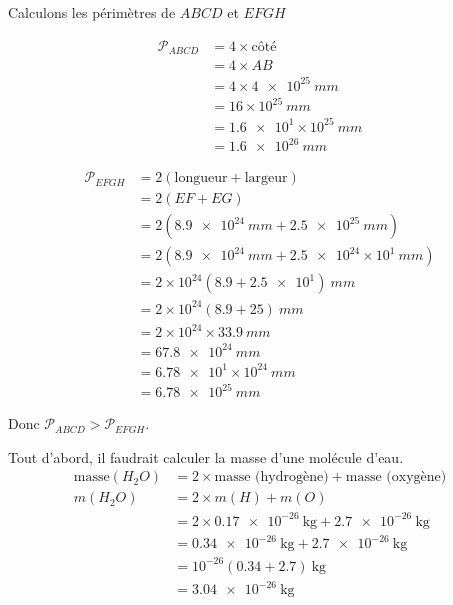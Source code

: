 \documentclass[../Cours.tex]{subfiles}
\begin{document}
\begin{questions}
        \question Calculons les périmètres de $ABCD$ et $EFGH$\\
        \noindent\begin{minipage}{0.5\linewidth}
        \begin{align*}
            \mathcal{P}_{ABCD} &= 4 \times \mbox{côté} \\
            &= 4 \times AB \\
            &= 4 \times \qty{4e25}{mm} \\
            &= 16 \times 10^{25}~\unit{mm} \\
            &= \num{1.6e1} \times 10^{25}~\unit{mm} \\
            &= \qty{1.6e26}{mm}
        \end{align*}
        \end{minipage}
        \begin{minipage}{0.5\linewidth}
        \begin{align*}
            \mathcal{P}_{EFGH} &= 2 \left( \mbox{longueur} + \mbox{largeur} \right) \\
            &= 2 \left( EF + EG \right) \\
            &= 2 \left( \qty{8.9e24}{mm} + \qty{2.5e25}{mm} \right) \\
            &= 2 \left( \qty{8.9e24}{mm} + \num{2.5e24} \times 10^1 ~\unit{mm} \right) \\
            &= 2 \times 10^{24} \left( \num{8.9} + \num{2.5e1} \right)~\unit{mm} \\
            &= 2 \times 10^{24} \left( \num{8.9} + 25 \right)~\unit{mm} \\
            &= 2 \times 10^{24} \times \qty{33.9}{mm} \\
            &= \qty{67.8e24}{mm} \\
            &= \num{6.78e1} \times 10^{24} ~\unit{mm} \\
            &= \qty{6.78e25}{mm}
        \end{align*}
        \end{minipage}

        \centerline{Donc $\mathcal{P}_{ABCD} > \mathcal{P}_{EFGH}$.}

        \question Tout d'abord, il faudrait calculer la masse d'une molécule d'eau.
        \begin{align*}
            \mbox{masse} (H_2O) &= 2 \times \mbox{masse (hydrogène)} + \mbox{masse (oxygène)} \\
            m(H_2O) &= 2 \times m(H) + m(O) \\
            &= 2 \times \qty{0.17e-26}{\kilo\gram} + \qty{2.7e-26}{\kilo\gram} \\
            &= \qty{0.34e-26}{\kilo\gram} + \qty{2.7e-26}{\kilo\gram} \\
            &= 10^{-26} \left( \num{0.34} + \num{2.7} \right) ~\unit{\kilo\gram}\\
            &= \qty{3.04e-26}{\kilo\gram}
        \end{align*}


\end{questions}
\end{document}
